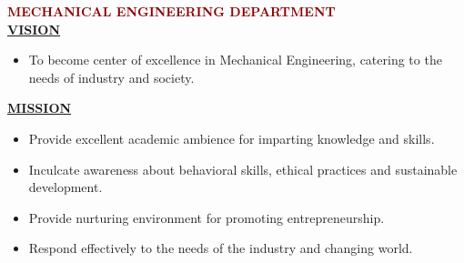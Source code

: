 \vspace{8mm}
\begin{center}
  {\fontsize{14}{18}\selectfont \bfseries \textcolor{darkred}{MECHANICAL ENGINEERING DEPARTMENT}}\\[6mm]
  {\fontsize{13}{16}\selectfont \bfseries \underline{VISION}}\\[3mm]
\end{center}
\begin{itemize}[leftmargin=12mm, label=\textbullet]
  \item To become center of excellence in Mechanical Engineering, catering to the needs of industry and society.
\end{itemize}

\begin{center}
  \vspace{4mm}
  {\fontsize{13}{16}\selectfont \bfseries \underline{MISSION}}\\[3mm]
\end{center}
\begin{itemize}[leftmargin=12mm, label=\textbullet]
  \item Provide excellent academic ambience for imparting knowledge and skills.
  \item Inculcate awareness about behavioral skills, ethical practices and sustainable development.
  \item Provide nurturing environment for promoting entrepreneurship.
  \item Respond effectively to the needs of the industry and changing world.
\end{itemize}
\clearpage
